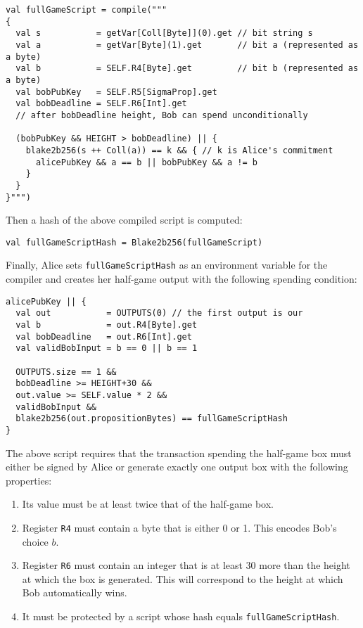\documentclass[11pt]{article}
\begin{document}
\begin{verbatim}
val fullGameScript = compile("""
{
  val s           = getVar[Coll[Byte]](0).get // bit string s 
  val a           = getVar[Byte](1).get       // bit a (represented as a byte)
  val b           = SELF.R4[Byte].get         // bit b (represented as a byte)
  val bobPubKey   = SELF.R5[SigmaProp].get
  val bobDeadline = SELF.R6[Int].get 
  // after bobDeadline height, Bob can spend unconditionally

  (bobPubKey && HEIGHT > bobDeadline) || {
    blake2b256(s ++ Coll(a)) == k && { // k is Alice's commitment
      alicePubKey && a == b || bobPubKey && a != b
    }
  }
}""")
\end{verbatim}

Then a hash of the above compiled script is computed:

\begin{verbatim}
val fullGameScriptHash = Blake2b256(fullGameScript)
\end{verbatim}

Finally, Alice sets \texttt{fullGameScriptHash} as an environment variable for the compiler and creates her half-game output with the following spending condition:

\begin{verbatim}
alicePubKey || {
  val out           = OUTPUTS(0) // the first output is our 
  val b             = out.R4[Byte].get
  val bobDeadline   = out.R6[Int].get
  val validBobInput = b == 0 || b == 1

  OUTPUTS.size == 1 &&
  bobDeadline >= HEIGHT+30 &&
  out.value >= SELF.value * 2 &&
  validBobInput &&
  blake2b256(out.propositionBytes) == fullGameScriptHash
}
\end{verbatim}

The above script requires that the transaction spending the half-game box must either be signed by Alice or generate exactly one output box with the following properties:

\begin{enumerate}
	\item Its value must be at least twice that of the half-game box.
	\item Register \texttt{R4} must contain a byte that is either 0 or 1. This encodes Bob's choice $b$.
	\item Register \texttt{R6} must contain an integer that is at least 30 more than the height at which the box is generated. This will correspond to the height at which Bob automatically wins.
	\item It must be protected by a script whose hash equals \texttt{fullGameScriptHash}.
\end{enumerate}
 
\end{document}
